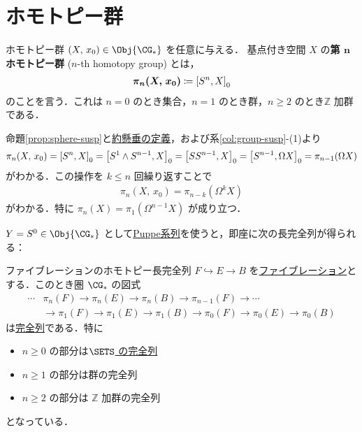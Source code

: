 \documentclass[algtopo_main]{subfiles}
\begin{document}
\section{ホモトピー群}

\begin{mydef}[label=def:homotopy-group]{ホモトピー群}
    $(X,\, x_0) \in \Obj{\CG_*}$ を任意に与える．
    基点付き空間 $X$ の\textbf{第 $\bm{n}$ ホモトピー群} ($n$-th homotopy group) とは，
    \begin{align}
        \bm{\pi_n (X,\, x_0)} \coloneqq \comm{S^n}{X}_0
    \end{align}
    のことを言う．これは $n=0$ のとき集合，$n=1$ のとき群，$n \ge 2$ のとき$\mathbb{Z}$ 加群である．
\end{mydef}

命題\ref{prop:sphere-susp}と\hyperref[def:suspension]{約懸垂の定義}，および系\ref{col:group-susp}-(1)より
\begin{align}
    \pi_n (X,\, x_0) = \comm{S^n}{X}_0 = \comm{S^{1} \wedge S^{n-1}}{X}_0 = \comm{SS^{n-1}}{X}_0 = \comm{S^{n-1}}{\Omega X}_0 = \pi_{n-1}(\Omega X)
\end{align}
がわかる．この操作を $k \le n$ 回繰り返すことで
\begin{align}
    \pi_{n}(X,\, x_0) = \pi_{n-k}(\Omega^k X)
\end{align}
がわかる．特に $\pi_n (X) = \pi_1 (\Omega^{n-1} X)$ が成り立つ．

$Y = S^0 \in \Obj{\CG_*}$ として\hyperref[ES:Puppe]{Puppe系列}を使うと，即座に次の長完全列が得られる：

\begin{mytheo}[label=ES:homotopy]{ファイブレーションのホモトピー長完全列}
    $F \hookrightarrow E \to B$ を\hyperref[def:fibration]{ファイブレーション}とする．このとき圏 $\CG_*$ の図式
    \begin{align}
        \cdots &\pi_n (F) \to \pi_n (E) \to \pi_n (B) \to \pi_{n-1} (F) \to \cdots \\
        &\to \pi_1(F) \to \pi_1(E) \to \pi_1(B) \to \pi_0 (F) \to \pi_0 (E) \to \pi_0(B)
    \end{align}
    は\hyperref[def:ES-SETS]{完全列}である．特に
    \begin{itemize}
        \item $n \ge 0$ の部分は\hyperref[def:ES-SETS]{$\SETS$ の完全列}
        \item $n \ge 1$ の部分は群の完全列
        \item $n \ge 2$ の部分は $\mathbb{Z}$ 加群の完全列
    \end{itemize}
    となっている．
\end{mytheo}
\end{document}
